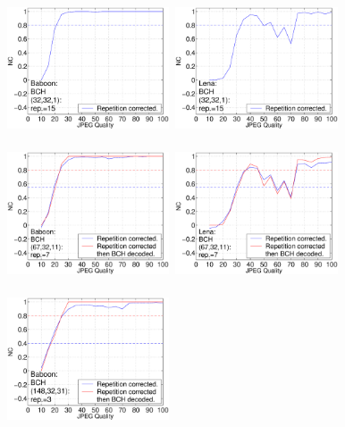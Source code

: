 \documentclass[12pt]{report}
\begin{document}
\begin{figure}[p]
\centerline{ \hbox{
\includegraphics[height=3.81cm,width=4.8cm]{EPS_BK_formattedBetter/ml32bab32.eps}
\includegraphics[height=3.81cm,width=4.8cm]{EPS_BK_formattedBetter/ml32len32.eps}\\
}}
\centerline{ \hbox{
\includegraphics[height=3.81cm,width=4.8cm]{EPS_BK_formattedBetter/ml32bab67.eps}
\includegraphics[height=3.81cm,width=4.8cm]{EPS_BK_formattedBetter/ml32len67.eps} \\
}}
\centerline{ \hbox{
\includegraphics[height=3.81cm,width=4.8cm]{EPS_BK_formattedBetter/ml32bab148.eps}
}}
\end{figure}
\end{document}

